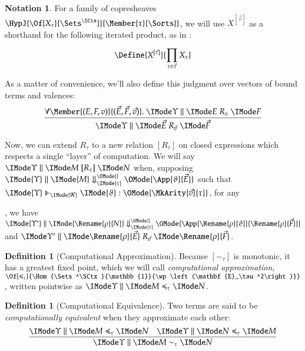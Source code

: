 \documentclass[11pt]{article}
\theoremstyle{definition}
\newtheorem{definition}[thm]{Definition}
\theoremstyle{notation}
\newtheorem*{notation*}{Notation}
\theoremstyle{remark}
\numberwithin{equation}{section}
\newcommand\Pow[1]{\wp\left(#1\right)}
\newcommand\CanOperators{\mathcal{K}}
\newcommand\EvalN[5]{\IMode{#1}\parallel\IMode{#4}\Downarrow^{\OMode{#3}}_{\IMode{#2}}\OMode{#5}}
\newcommand\Eval[4]{\EvalN{#1}{#2}{}{#3}{#4}}
\newcommand\Exprs{\mathbf{E}}
\begin{document}
\begin{notation*}
  For a family of copresheaves $\HypJ{\Of{X_\tau}{\Sets^\SCtx}}{\Member{\tau}{\Sorts}}$, we will
  use $X^{[\vec{\tau}]}$ as a shorthand for the following iterated product, as
  in \cite{sterling-morrison:2015}:

  \[
    \Define{
      X^{[\vec{\tau}]}
    }{
      \prod_{\tau\in\vec{\tau}}
        X_\tau
    }
  \]
\end{notation*}

As a matter of convenience, we'll also define this judgment over vectors of
bound terms and valences:
\[
  \infer{
    \SBinRel{R_{\vec{v}}}{\Upsilon}{\vec{E}}{\vec{F}}
  }{
    \forall\Member{(E,F,v)}{(\vec{E},\vec{F},\vec{v})}.\
    \SBinRel{R_v}{\Upsilon}{E}{F}
  }
\]

Now, we can extend $R_\tau$ to a new relation $[R_\tau]$ on closed expressions
which respects a single ``layer'' of computation. We will say
$\SBinRel{[R_\tau]}{\Upsilon}{M}{N}$ when, supposing
$\Eval{\Upsilon}{\tau}{M}{\App{\vartheta}{\Vec{E}}}$ such that
$\IMode{\Upsilon}\Vdash_{\IMode{\CanOperators}}\IMode{\vartheta}:\OMode{\MkArity{\vec{v}}{\tau}}$,
for any
, we have $\Eval{\Upsilon'}{\tau}{\Rename{\rho}{N}}{\App{\Rename{\rho}{\vartheta}}{\Rename{\rho}{\Vec{F}}}}$ and
$\SBinRel{R_{\vec{v}}}{\Upsilon'}{\Rename{\rho}{\vec{E}}}{\Rename{\rho}{\vec{F}}}$.

\begin{definition}[Computational Approximation]
Because $[-_\tau]$ is monotonic, it has a greatest fixed point, which we will
call \emph{computational approximation},
$\Of{\preccurlyeq_\tau}{\Hom{\Sets^\SCtx}{\mathbb{1}}{\Pow{\Exprs_\tau^2}}}$,
written pointwise as $\SBinRel{\preccurlyeq_\tau}{\Upsilon}{M}{N}$.
\end{definition}

\begin{definition}[Computational Equivalence]
  Two terms are said to be \emph{computationally equivalent} when they approximate each other:
  \[
    \infer{
      \SBinRel{\sim_\tau}{\Upsilon}{M}{N}
    }{
      \SBinRel{\preccurlyeq_\tau}{\Upsilon}{M}{N} &
      \SBinRel{\preccurlyeq_\tau}{\Upsilon}{N}{M}
    }
  \]
\end{definition}


\ifdraft{}{
  \newpage
  \nocite{maclane:1971}
  
  
}
\end{document}
